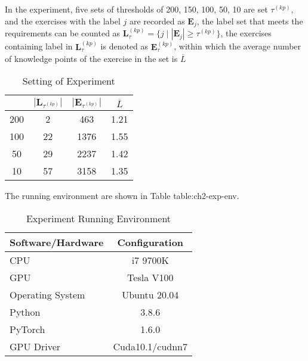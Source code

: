 In the experiment, five sets of thresholds of 200, 150, 100, 50, 10 are set \(\tau^{(kp)} \), and the exercises with the label \(j\) are recorded as \(\mathbf{E}_j\), the label set that meets the requirements can be counted as \(\mathbf{L}_\tau^{(kp)}=\{j\mid |\mathbf{E}_j|\geq\tau^{(kp)}\} \), the exercises containing label in \(\mathbf{L}_\tau^{(kp)} \) is denoted as \(\mathbf{E}_\tau^{(kp)} \), within which the average number of knowledge points of the exercise in the set is \(\overline{L}\)

\begin{table}[H]
	\centering
	\caption{Setting of Experiment}\label{tbl:ch2-ex1}
	\begin{tabular}{cccc}%
		\toprule
		\text{\(\tau^{(kp)} \)} & \(|\mathbf{L}_{\tau^{(kp)}}|\) & \(|\mathbf{E}_{\tau^{(kp)}}| \) & \(\overline{L}\) \\
		\midrule
		200                     & 2                              & 463                             & 1.21             \\
		100                     & 22                             & 1376                            & 1.55             \\
		50                      & 29                             & 2237                            & 1.42             \\
		10                      & 57                             & 3158                            & 1.35             \\
		\bottomrule
	\end{tabular}
\end{table}

The running environment are shown in Table {table:ch2-exp-env}.

\begin{table}[htbp]
	\caption{Experiment Running Environment}\label{table:ch2-exp-env}
	\centering
	\begin{tabular}{l c}
		\toprule
		Software/Hardware & Configuration   \\
		\midrule
		CPU               & i7 9700K        \\

		GPU               & Tesla V100      \\

		Operating System  & Ubuntu 20.04    \\

		Python            & 3.8.6           \\

		PyTorch           & 1.6.0           \\

		GPU Driver        & Cuda10.1/cudnn7 \\
		\bottomrule
	\end{tabular}
\end{table}


